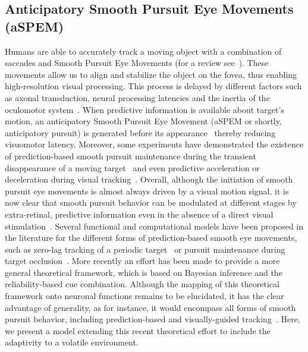 \documentclass[10pt,letterpaper]{article}
\newcommand{\citep}[1]{\cite{#1}}
\newcommand{\citet}[1]{\cite{#1}}
\begin{document}
\subsection{Anticipatory Smooth Pursuit Eye Movements (aSPEM)}
Humans are able to accurately track a moving object
with a combination of saccades and
Smooth Pursuit Eye Movements (for a review see~\citet{Krauzlis2008}).
These movements allow us to align and
stabilize the object on the fovea,
thus enabling high-resolution visual processing.
This process is delayed by different factors such as axonal transduction,
neural processing latencies and the inertia of the oculomotor system~\citep{Krauzlis89}.
When predictive information is available about target's motion,
an anticipatory Smooth Pursuit Eye Movement (aSPEM or shortly, anticipatory pursuit)
is generated before its appearance~\citep{Westheimer1954, Kowler1979a, Kowler1979b}
thereby reducing visuomotor latency.
Moreover, some experiments have demonstrated the existence
of prediction-based smooth pursuit maintenance during
the transient disappearance of a moving target~\citep{Badler2006,BeckerFuchs1985,OrbandeXivryMissalLefevre_JOV2012}
and even predictive acceleration or deceleration during visual tracking~\citep{BeckerFuchs1985,CollinsBarnes2009}.
Overall, although the initiation of smooth pursuit eye movements
is almost always driven by a visual motion signal,
it is now clear that smooth pursuit behavior
can be modulated at different stages by extra-retinal, predictive information even in the absence of a direct visual stimulation~\citep{Barnes2008}.
Several functional and computational models have been proposed in the literature for the different forms of prediction-based smooth eye movements, such as zero-lag tracking of a periodic target~\citep{DallosJones1963} or pursuit maintenance during target occlusion~\citep{CollinsBarnes2009}. More recently an effort has been made to provide a more general theoretical framework, which is based on Bayesian inference and the reliability-based cue combination. Although the mapping of this theoretical framework onto neuronal functions remains to be elucidated, it has the clear advantage of generality, as for instance, it would encompass all forms of smooth pursuit behavior, including prediction-based and visually-guided tracking~\citep{Bogadhi2013,Orban2013,Deravet_JOV2018,Darlington_NatNeu2018}. Here, we present a model extending this recent theoretical effort to include the adaptivity to a volatile environment.
\end{document}
